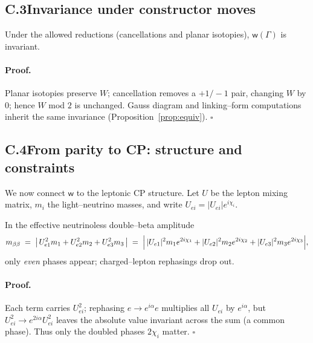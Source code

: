\documentclass[11pt]{article}
\begin{document}
\subsection*{C.3\quad Invariance under constructor moves}

\begin{lemma}\label{lem:inv}
Under the allowed reductions (cancellations and planar isotopies), $\mathsf{w}(\Gamma)$ is invariant.
\end{lemma}

\paragraph{Proof.}
Planar isotopies preserve $W$; cancellation removes a $+1/-1$ pair, changing $W$ by $0$; hence $W$ mod $2$ is unchanged. Gauss diagram and linking–form computations inherit the same invariance (Proposition~\ref{prop:equiv}). \hfill$\square$

\subsection*{C.4\quad From parity to CP: structure and constraints}

We now connect $\mathsf{w}$ to the leptonic CP structure. Let $U$ be the lepton mixing matrix, $m_i$ the light–neutrino masses, and write $U_{ei}=|U_{ei}|e^{i\chi_i}$.

\begin{lemma}\label{lem:even}
In the effective neutrinoless double–beta amplitude
\[
m_{\beta\beta}\;=\;\bigl|\,U_{e1}^2m_1+U_{e2}^2m_2+U_{e3}^2m_3\,\bigr|
\;=\;\Bigl|\,|U_{e1}|^2m_1e^{2i\chi_1}+|U_{e2}|^2m_2e^{2i\chi_2}+|U_{e3}|^2m_3e^{2i\chi_3}\Bigr|,
\]
only \emph{even} phases appear; charged–lepton rephasings drop out.
\end{lemma}

\paragraph{Proof.}
Each term carries $U_{ei}^2$; rephasing $e\to e^{i\alpha}e$ multiplies all $U_{ei}$ by $e^{i\alpha}$, but $U_{ei}^2\to e^{2i\alpha}U_{ei}^2$ leaves the absolute value invariant across the sum (a common phase). Thus only the doubled phases $2\chi_i$ matter. \hfill$\square$
\end{document}
